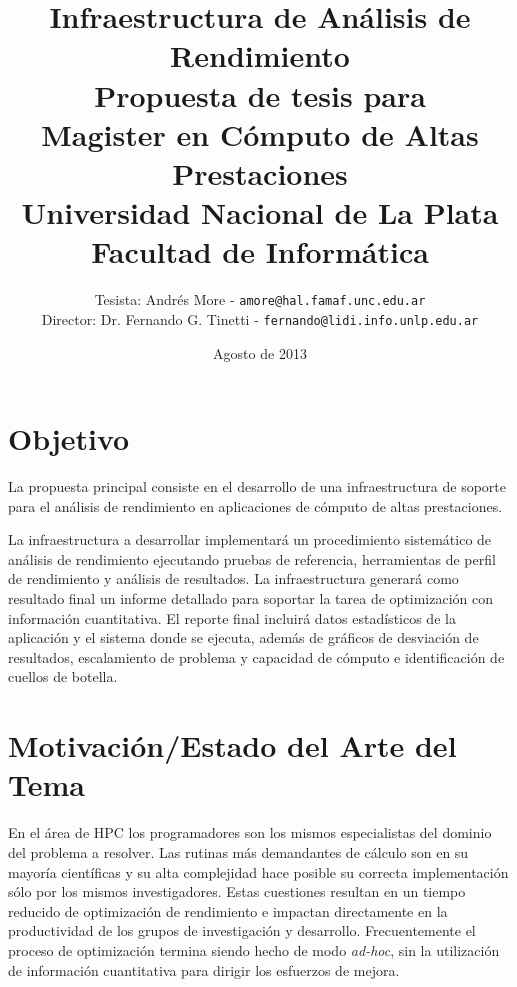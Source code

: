 \documentclass[a4paper]{article}
\begin{document}
\title{Infraestructura de Análisis de Rendimiento\\
\bigskip
{\large Propuesta de tesis para\\} Magister en Cómputo de Altas Prestaciones\\
\bigskip
Universidad Nacional de La Plata\\
Facultad de Informática\\
\bigskip
}

\author{Tesista: Andrés More - {\tt amore@hal.famaf.unc.edu.ar}\\
Director: Dr. Fernando G. Tinetti - {\tt fernando@lidi.info.unlp.edu.ar}}

\date{Agosto de 2013}

\maketitle

\newpage

\section{Objetivo}

La propuesta principal consiste en el desarrollo de una infraestructura de soporte para el análisis de rendimiento en aplicaciones de cómputo de altas prestaciones.

\bigskip

La infraestructura a desarrollar implementará un procedimiento sistemático de análisis de rendimiento ejecutando pruebas de referencia, herramientas de perfil de rendimiento y análisis de resultados.  La infraestructura generará como resultado final un informe detallado para soportar la tarea de optimización con información cuantitativa. El reporte final incluirá datos estadísticos de la aplicación y el sistema donde se ejecuta, además de gráficos de desviación de resultados, escalamiento de problema y capacidad de cómputo e identificación de cuellos de botella.

\section{Motivación/Estado del Arte del Tema}

En el área de HPC los programadores son los mismos especialistas del dominio del problema a resolver. Las rutinas
más demandantes de cálculo son en su mayoría científicas y su alta complejidad hace posible su correcta implementación sólo por los mismos investigadores. Estas cuestiones resultan en un tiempo reducido de optimización de rendimiento
e impactan directamente en la productividad de los grupos de investigación y desarrollo. Frecuentemente el proceso de optimización termina siendo hecho de modo {\it ad-hoc}, sin la utilización de información cuantitativa para dirigir los
esfuerzos de mejora.
\end{document}
